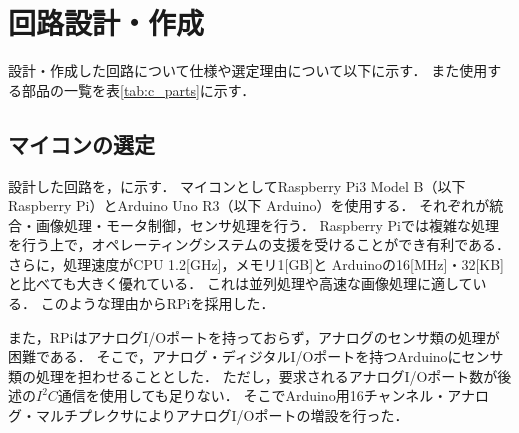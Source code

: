 \documentclass[11pt,a4]{jsarticle}
\begin{document}

\section{回路設計・作成}  %

  設計・作成した回路について仕様や選定理由について以下に示す．
  また使用する部品の一覧を表\ref{tab:c_parts}に示す．

  \subsection{マイコンの選定}
    設計した回路を，に示す．
    マイコンとしてRaspberry Pi3 Model B（以下 Raspberry Pi）とArduino Uno R3（以下 Arduino）を使用する．
    それぞれが統合・画像処理・モータ制御，センサ処理を行う．
    Raspberry Piでは複雑な処理を行う上で，オペレーティングシステムの支援を受けることができ有利である．
    さらに，処理速度がCPU 1.2[GHz]，メモリ1[GB]と
    Arduinoの16[MHz]・32[KB]と比べても大きく優れている．
    これは並列処理や高速な画像処理に適している．
    このような理由からRPiを採用した．

    また，RPiはアナログI/Oポートを持っておらず，アナログのセンサ類の処理が困難である．
    そこで，アナログ・ディジタルI/Oポートを持つArduinoにセンサ類の処理を担わせることとした．
    ただし，要求されるアナログI/Oポート数が後述の$I^2 C$通信を使用しても足りない．
    そこでArduino用16チャンネル・アナログ・マルチプレクサによりアナログI/Oポートの増設を行った．
\end{document}
